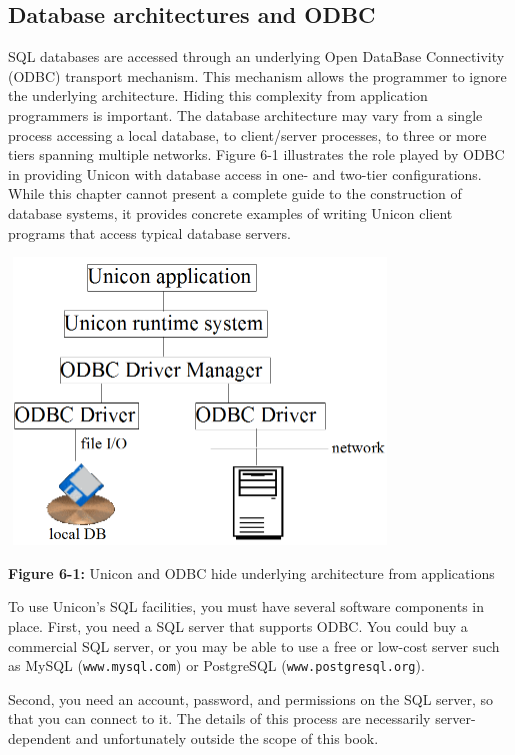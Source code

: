 \subsection{Database architectures and ODBC}

SQL databases are accessed through an underlying Open
DataBase Connectivity (ODBC) transport mechanism. This mechanism allows
the programmer to ignore the underlying architecture. Hiding this
complexity from application programmers is important. The database
architecture may vary from a single process accessing a local database,
to client/server processes, to three or more tiers spanning multiple
networks. Figure 6-1 illustrates the role played by ODBC in providing
Unicon with database access in one- and two-tier configurations. While
this chapter cannot present a complete guide to the construction of
database systems, it provides concrete examples of writing Unicon
client programs that access typical database servers.

\begin{center}
\includegraphics[width=4in,height=3in]{ub-img/odbcarch.png}
\end{center}

{\sffamily\bfseries Figure 6-1:}
{\sffamily Unicon and ODBC hide underlying architecture from
 applications}

\bigskip

To use Unicon's SQL facilities, you must have several
software components in place. First, you need a SQL server that
supports ODBC. You could buy a commercial SQL server, or you may be
able to use a free or low-cost server such as MySQL
(\texttt{www.mysql.com}) or PostgreSQL
(\texttt{www.postgresql.org}).

Second, you need an account, password, and permissions on the SQL
server, so that you can connect to it. The details of this process are
necessarily server-dependent and unfortunately outside the scope of
this book.

